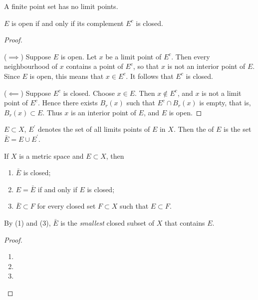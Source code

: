 \begin{corollary}
A finite point set has no limit points.
\end{corollary}

\begin{proposition}
$E$ is open if and only if its complement $E^c$ is closed.
\end{proposition}

\begin{proof} \

($\implies$) Suppose $E$ is open. Let $x$ be a limit point of $E^c$. Then every neighbourhood of $x$ contains a point of $E^c$, so that $x$ is not an interior point of $E$. Since $E$ is open, this means that $x\in E^c$. It follows that $E^c$ is closed.

($\impliedby$) Suppose $E^c$ is closed. Choose $x\in E$. Then $x\notin E^c$, and $x$ is not a limit point of $E^c$. Hence there exists $B_r(x)$ such that $E^c\cap B_r(x)$ is empty, that is, $B_r(x)\subset E$. Thus $x$ is an interior point of $E$, and $E$ is open.
\end{proof}

\begin{definition}
$E\subset X$, $E^\prime$ denotes the set of all limits points of $E$ in $X$. Then the  of $E$ is the set $\bar{E}=E\cup E^\prime$.
\end{definition}

\begin{proposition}
If $X$ is a metric space and $E\subset X$, then
\begin{enumerate}[label=(\arabic*)]
\item $\bar{E}$ is closed;
\item $E=\bar{E}$ if and only if $E$ is closed;
\item $\bar{E}\subset F$ for every closed set $F\subset X$ such that $E\subset F$.
\end{enumerate}
By (1) and (3), $\bar{E}$ is the \emph{smallest} closed subset of $X$ that contains $E$.
\end{proposition}

\begin{proof} \
\begin{enumerate}[label=(\arabic*)]
\item 
\item 
\item 
\end{enumerate}
\end{proof}

